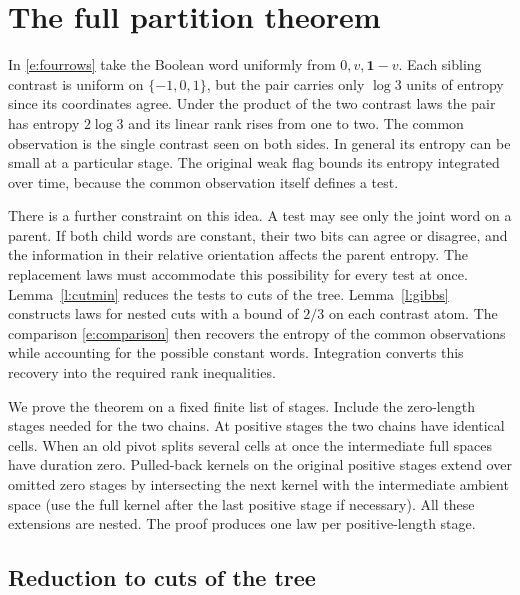 \documentclass[11pt]{article}
\numberwithin{equation}{section}
\newcommand{\one}{\mathbf 1}
\begin{document}
\section{The full partition theorem}\label{s:tree}

In \eqref{e:fourrows} take the Boolean word uniformly from
$0,v,\one-v$. Each sibling contrast is uniform on $\{-1,0,1\}$,
but the pair carries only $\log3$ units of entropy since its
coordinates agree. Under the product of the two contrast laws
the pair has entropy $2\log3$ and its linear rank rises from one
to two. The common observation is the single contrast seen on
both sides. In general its entropy can be small at a particular
stage. The original weak flag bounds its entropy integrated over
time, because the common observation itself defines a test.

There is a further constraint on this idea. A test may see only
the joint word on a parent. If both child words are constant,
their two bits can agree or disagree, and the information in their
relative orientation affects the parent entropy. The replacement
laws must accommodate this possibility for every test at once.
Lemma~\ref{l:cutmin} reduces the tests to cuts of the tree.
Lemma~\ref{l:gibbs} constructs laws for nested cuts with a
bound of $2/3$ on each contrast atom. The comparison
\eqref{e:comparison} then recovers the entropy of the common
observations while accounting for the possible constant words.
Integration converts this recovery into the required rank
inequalities.

We prove the theorem on a fixed finite list of stages. Include the
zero-length stages needed for the two chains. At positive stages
the two chains have identical cells. When an old pivot splits
several cells at once the intermediate full spaces have duration
zero. Pulled-back kernels on the original positive stages extend
over omitted zero stages by intersecting the next kernel with
the intermediate ambient space (use the full kernel after the
last positive stage if necessary). All these extensions are
nested. The proof produces one law per positive-length stage.

\subsection{Reduction to cuts of the tree}
\end{document}
